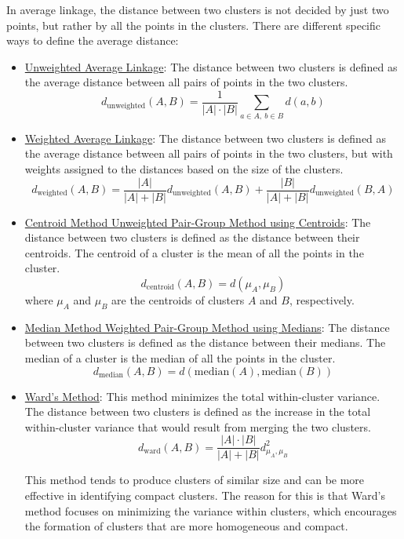 In average linkage, the distance between two clusters is not decided by just two points, but rather by all the points in the clusters. There are different specific ways to define the average distance:
\begin{itemize}
    \item \ul{Unweighted Average Linkage}: The distance between two clusters is defined as the average distance between all pairs of points in the two clusters.
    \begin{equation*}
        d_{\text{unweighted}}(A, B) = \frac{1}{|A|\cdot |B|} \sum_{a\in A,\ b\in B} d(a, b)
    \end{equation*}
    
    \item \ul{Weighted Average Linkage}: The distance between two clusters is defined as the average distance between all pairs of points in the two clusters, but with weights assigned to the distances based on the size of the clusters.
    \begin{equation*}
        d_{\text{weighted}}(A, B) = \frac{|A|}{|A| + |B|} d_{\text{unweighted}}(A, B) + \frac{|B|}{|A| + |B|} d_{\text{unweighted}}(B, A)
    \end{equation*}

    \item \ul{Centroid Method Unweighted Pair-Group Method using Centroids}:
    The distance between two clusters is defined as the distance between their centroids. The centroid of a cluster is the mean of all the points in the cluster.
    \begin{equation*}
        d_{\text{centroid}}(A, B) = d(\mu_A, \mu_B)
    \end{equation*}
    where $\mu_A$ and $\mu_B$ are the centroids of clusters $A$ and $B$, respectively.

    \item \ul{Median Method Weighted Pair-Group Method using Medians}:
    The distance between two clusters is defined as the distance between their medians. The median of a cluster is the median of all the points in the cluster.
    \begin{equation*}
        d_{\text{median}}(A, B) = d(\text{median}(A), \text{median}(B))
    \end{equation*}

    \item \ul{Ward's Method}: This method minimizes the total within-cluster variance. The distance between two clusters is defined as the increase in the total within-cluster variance that would result from merging the two clusters.
    \begin{equation*}
        d_{\text{ward}}(A, B) = \frac{|A| \cdot |B|}{|A| + |B|} d_{\mu_A, \mu_B}^2
    \end{equation*}

    This method tends to produce clusters of similar size and can be more effective in identifying compact clusters. The reason for this is that Ward's method focuses on minimizing the variance within clusters, which encourages the formation of clusters that are more homogeneous and compact.
\end{itemize}

